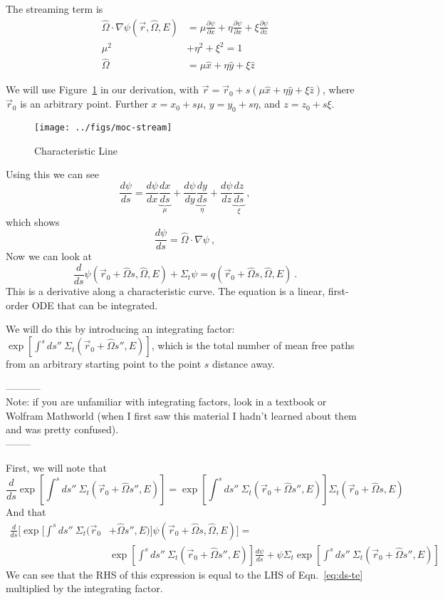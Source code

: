 \documentclass[12pt]{article}
\newcommand{\rvec}{\ensuremath{\vec{r}}}
\newcommand{\vOmega}{\ensuremath{\hat{\Omega}}}
\begin{document}
The streaming term is 
\begin{align*}
\vOmega \cdot \nabla \psi(\rvec, \vOmega, E) &= \mu \frac{\partial \psi}{\partial x} + \eta \frac{\partial \psi}{\partial x} + \xi \frac{\partial \psi}{\partial z} \\
\mu^2 &+ \eta^2 + \xi^2 = 1 \\
\vOmega &= \mu \hat{x} + \eta \hat{y} + \xi \hat{z}
\end{align*}
%

We will use Figure~\ref{fig:stream} in our derivation, with $\vec{r} = \rvec_0 + s(\mu \hat{x} + \eta \hat{y} + \xi \hat{z})$, where $\rvec_0$ is an arbitrary point.
Further $x = x_0 + s\mu$, $y = y_0 + s\eta$, and $z = z_0 + s\xi$.
%
\begin{figure}[h!] 
    \begin{center}
    \texttt{[image: ../figs/moc-stream]}    
    \end{center}   
    \caption{Characteristic Line}
    \label{fig:stream}
\end{figure}

Using this we can see
\[\frac{d\psi}{ds} = \frac{d\psi}{dx}\underbrace{\frac{dx}{ds}}_{\mu} + \frac{d\psi}{dy}\underbrace{\frac{dy}{ds}}_{\eta} + \frac{d\psi}{dz}\underbrace{\frac{dz}{ds}}_{\xi}\:,\]
which shows 
\[\frac{d\psi}{ds} = \vOmega \cdot \nabla \psi\:,\]
Now we can look at
\begin{equation}
\frac{d}{ds}\psi(\rvec_0 + \vOmega s, \vOmega, E) + \Sigma_t \psi = q(\rvec_0 + \vOmega s, \vOmega, E)\:.
\label{eq:ds-te}
\end{equation}
This is a derivative along a characteristic curve. 
The equation is a linear, first-order ODE that can be integrated. 


We will do this by introducing an integrating factor: $\exp[\int^s ds'' \: \Sigma_t(\rvec_0 + \vOmega s'', E)]$, which is the total number of mean free paths from an arbitrary starting point to the point $s$ distance away.

-----------\\
Note: if you are unfamiliar with integrating factors, look in a textbook or Wolfram Mathworld (when I first saw this material I hadn't learned about them and was pretty confused). \\
--------

First, we will note that
\[\frac{d}{ds}\exp[\int^s ds'' \: \Sigma_t(\rvec_0 + \vOmega s'', E)] = \exp[\int^s ds'' \: \Sigma_t(\rvec_0 + \vOmega s'', E)] \Sigma_t(\rvec_0 + \vOmega s, E)\]
And that
\begin{align*}
\frac{d}{ds}\biggl[\exp[\int^s ds'' \: \Sigma_t(\rvec_0 &+ \vOmega s'', E)]\psi(\rvec_0 + \vOmega s, \vOmega, E)\biggr] =\\ &\exp[\int^s ds'' \: \Sigma_t(\rvec_0 + \vOmega s'', E)]\frac{d \psi}{ds} + \psi \Sigma_t \exp[\int^s ds'' \: \Sigma_t(\rvec_0 + \vOmega s'', E)]
\end{align*}
We can see that the RHS of this expression is equal to the LHS of Eqn.~\ref{eq:ds-te} multiplied by the integrating factor.
\end{document}
